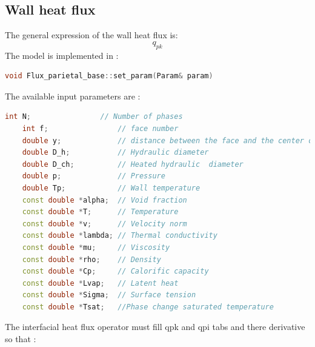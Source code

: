 \subsection{Wall heat flux}
The general expression of the wall heat flux is:
\begin{equation}
    q_{pk}
\end{equation}
The model is implemented in :
\begin{lstlisting}[language=c++]
void Flux_parietal_base::set_param(Param& param)
\end{lstlisting}
The available input parameters are : 
\begin{lstlisting}[language=c++]
    int N;                // Number of phases
    int f;                // face number
    double y;             // distance between the face and the center of gravity of the cell
    double D_h;           // Hydraulic diameter
    double D_ch;          // Heated hydraulic  diameter
    double p;             // Pressure
    double Tp;            // Wall temperature
    const double *alpha;  // Void fraction
    const double *T;      // Temperature
    const double *v;      // Velocity norm
    const double *lambda; // Thermal conductivity
    const double *mu;     // Viscosity
    const double *rho;    // Density
    const double *Cp;     // Calorific capacity
    const double *Lvap;   // Latent heat
    const double *Sigma;  // Surface tension
    const double *Tsat;   //Phase change saturated temperature
\end{lstlisting}
The interfacial heat flux operator must fill qpk and qpi tabs and there derivative so that :
